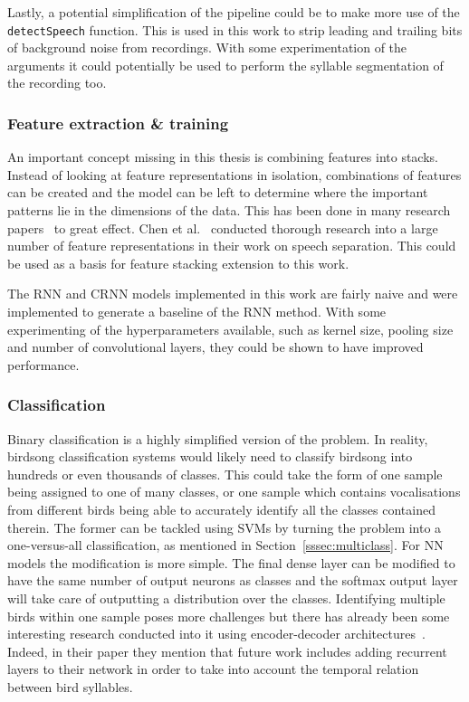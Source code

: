 Lastly, a potential simplification of the pipeline could be to make more use of
the \texttt{detectSpeech} function. This is used in this work to strip leading
and trailing bits of background noise from recordings. With some experimentation
of the arguments it could potentially be used to perform the syllable
segmentation of the recording too.

\subsubsection{Feature extraction \& training}

An important concept missing in this thesis is combining features into stacks.
Instead of looking at feature representations in isolation, combinations of
features can be created and the model can be left to determine where the
important patterns lie in the dimensions of the data. This has been done in many
research papers~\cite{yan2021birdsong,ramashini2019bird,somervuo2006parametric}
to great effect. Chen et al.~\cite{chen2014feature} conducted thorough research
into a large number of feature representations in their work on speech
separation. This could be used as a basis for feature stacking extension to this
work.

The RNN and CRNN models implemented in this work are fairly naive and were
implemented to generate a baseline of the RNN method. With some experimenting of
the hyperparameters available, such as kernel size, pooling size and number of
convolutional layers, they could be shown to have improved performance.

\subsubsection{Classification}

Binary classification is a highly simplified version of the problem. In reality,
birdsong classification systems would likely need to classify birdsong into
hundreds or even thousands of classes. This could take the form of one sample
being assigned to one of many classes, or one sample which contains
vocalisations from different birds being able to accurately identify all the
classes contained therein. The former can be tackled using SVMs by turning the
problem into a one-versus-all classification, as mentioned in
Section~\ref{sssec:multiclass}. For NN models the modification is more simple.
The final dense layer can be modified to have the same number of output neurons
as classes and the softmax output layer will take care of outputting a
distribution over the classes. Identifying multiple birds within one sample
poses more challenges but there has already been some interesting research
conducted into it using encoder-decoder
architectures~\cite{narasimhan2017simultaneous}. Indeed, in their paper they
mention that future work includes adding recurrent layers to their network in
order to take into account the temporal relation between bird syllables.

